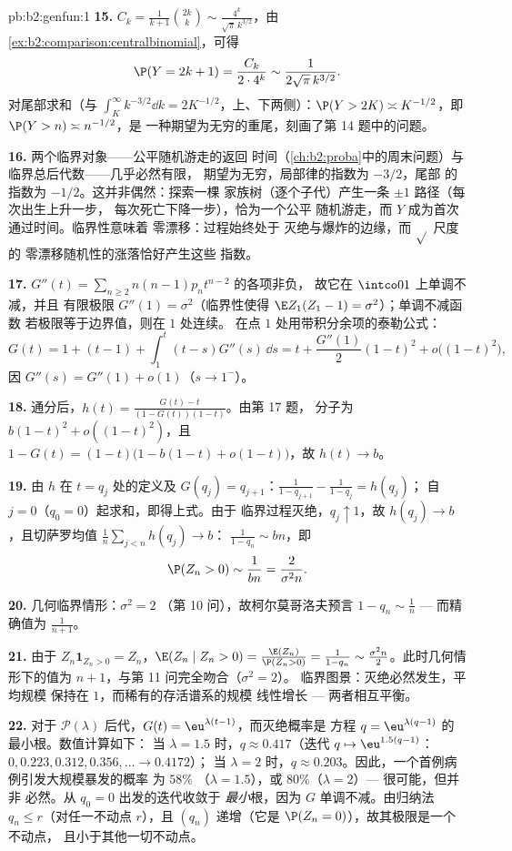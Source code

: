 \begin{solution}{pb:b2:genfun:1}
\textbf{15.} $C_k = \frac1{k+1}\binom{2k}k \sim
\frac{4^k}{\sqrt\pi\,k^{3/2}}$，由
\cref{ex:b2:comparison:centralbinomial}，可得
\[
\P(Y = 2k+1) = \frac{C_k}{2\cdot4^{k}} \sim
\frac1{2\sqrt\pi\,k^{3/2}} .
\]
对尾部求和（与 $\int_K^\infty
k^{-3/2}\dd k = 2K^{-1/2}$，上、下两侧）：$\P(Y > 2K)
\asymp K^{-1/2}$，即 $\P(Y > n) \asymp n^{-1/2}$，是
一种期望为无穷的重尾，刻画了第 14 题中的问题。

\textbf{16.} 两个临界对象——公平随机游走的返回
时间（\cref{ch:b2:proba}中的周末问题）与
临界总后代数——几乎必然有限，
期望为无穷，局部律的指数为 $-3/2$，尾部
的指数为 $-1/2$。这并非偶然：探索一棵
家族树（逐个子代）产生一条 $\pm1$ 路径（每次出生上升一步，
每次死亡下降一步），恰为一个公平
随机游走，而 $Y$ 成为首次通过时间。临界性意味着
零漂移：过程始终处于
灭绝与爆炸的边缘，而 $\sqrt{}$ 尺度的
零漂移随机性的涨落恰好产生这些
指数。

\textbf{17.} $G''(t) = \sum_{n\geq2}n(n-1)p_nt^{n-2}$ 的各项非负，
故它在 $\intco01$ 上单调不减，并且
有限极限 $G''(1) = \sigma^2$（临界性使得
$\E Z_1(Z_1 - 1) = \sigma^2$）；单调不减函数
若极限等于边界值，则在 $1$ 处连续。
在点 $1$ 处用带积分余项的泰勒公式：
\[
G(t) = 1 + (t - 1) + \int_1^t(t - s)G''(s)\,\dd s
= t + \frac{G''(1)}2(1-t)^2 + o\bigl((1-t)^2\bigr),
\]
因 $G''(s) = G''(1) + o(1)$（$s \to 1^-$）。

\textbf{18.} 通分后，$h(t) =
\frac{G(t) - t}{(1 - G(t))(1 - t)}$。由第 17 题，
分子为 $b(1-t)^2 + o((1-t)^2)$，且 $1 - G(t) = (1 -
t)\bigl(1 - b(1-t) + o(1-t)\bigr)$，故 $h(t) \to b$。

\textbf{19.} 由 $h$ 在 $t = q_j$ 处的定义及 $G(q_j) =
q_{j+1}$：$\frac1{1 - q_{j+1}} - \frac1{1-q_j} = h(q_j)$；
自 $j = 0$（$q_0 = 0$）起求和，即得上式。由于
临界过程灭绝，$q_j \uparrow 1$，故 $h(q_j) \to
b$，且切萨罗均值 $\frac1n\sum_{j<n}h(q_j) \to b$：
$\frac1{1-q_n} \sim bn$，即
\[
\P(Z_n > 0) \sim \frac1{bn} = \frac{2}{\sigma^2 n} .
\]

\textbf{20.} 几何临界情形：$\sigma^2 = 2$
（第 10 问），故柯尔莫哥洛夫预言 $1 - q_n \sim \frac1n$
--- 而精确值为 $\frac1{n+1}$。

\textbf{21.} 由于 $Z_n\mathbf 1_{Z_n > 0} = Z_n$，$\E(Z_n
\mid Z_n > 0) = \frac{\E(Z_n)}{\P(Z_n > 0)} = \frac1{1 -
q_n} \sim \frac{\sigma^2n}2$。此时几何情形下的值为
$n + 1$，与第 11 问完全吻合（$\sigma^2 = 2$）。
临界图景：灭绝必然发生，平均规模
保持在 $1$，而稀有的存活谱系的规模
线性增长 --- 两者相互平衡。

\textbf{22.} 对于 $\mathcal P(\lambda)$ 后代，$G(t) =
\eu^{\lambda(t-1)}$，而灭绝概率是
方程 $q = \eu^{\lambda(q-1)}$ 的最小根。数值计算如下：
当 $\lambda = 1.5$ 时，$q \approx 0.417$（迭代 $q \mapsto
\eu^{1.5(q-1)}$：$0, 0.223, 0.312, 0.356, \dots \to 0.4172$）；
当 $\lambda = 2$ 时，$q \approx 0.203$。因此，一个首例病例引发大规模暴发的概率
为 $58\%$
（$\lambda = 1.5$），或 $80\%$（$\lambda = 2$）--- 很可能，但并非
必然。从 $q_0 = 0$ 出发的迭代收敛于
\emph{最小}根，因为 $G$ 单调不减。由归纳法
$q_n \leq r$（对任一不动点 $r$），且 $(q_n)$
递增（它是 $\P(Z_n = 0)$），故其极限是一个不动点，
且小于其他一切不动点。


\end{solution}
